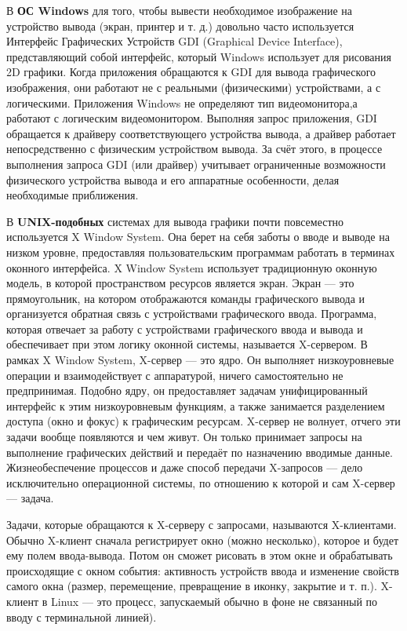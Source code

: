 \documentclass[13pt]{extarticle}
\begin{document}
В \textbf{ОС Windows} для того, чтобы вывести необходимое изображение на устройство вывода (экран, принтер и т. д.) довольно часто используется Интерфейс Графических Устройств GDI (Graphical Device Interface), представляющий собой интерфейс, который Windows использует для рисования 2D графики. Когда приложения обращаются к GDI для вывода графического изображения, они работают не с реальными (физическими) устройствами, а с логическими. Приложения Windows не определяют тип видеомонитора,а работают с логическим видеомонитором. Выполняя запрос приложения, GDI обращается к драйверу соответствующего устройства вывода, а драйвер работает непосредственно с физическим устройством вывода. За счёт этого, в процессе выполнения запроса GDI (или драйвер) учитывает ограниченные возможности физического устройства вывода и его аппаратные особенности, делая необходимые приближения. 

В \textbf{UNIX-подобных} системах для вывода графики почти повсеместно используется X Window System. Она берет на себя заботы о вводе и выводе на низком уровне, предоставляя пользовательским программам работать в терминах оконного интерфейса. X Window System использует традиционную оконную модель, в которой пространством ресурсов является экран. Экран — это прямоугольник, на котором отображаются команды графического вывода и организуется обратная связь с устройствами графического ввода. Программа, которая отвечает за работу с устройствами графического ввода и вывода и обеспечивает при этом логику оконной системы, называется X-сервером. В рамках X Window System, X-сервер — это ядро. Он выполняет низкоуровневые операции и взаимодействует с аппаратурой, ничего самостоятельно не предпринимая. Подобно ядру, он предоставляет задачам унифицированный интерфейс к этим низкоуровневым функциям, а также занимается разделением доступа (окно и фокус) к графическим ресурсам. X-сервер не волнует, отчего эти задачи вообще появляются и чем живут. Он только принимает запросы на выполнение графических действий и передаёт по назначению вводимые данные. Жизнеобеспечение процессов и даже способ передачи X-запросов — дело исключительно операционной системы, по отношению к которой и сам X-сервер — задача.

Задачи, которые обращаются к X-серверу с запросами, называются X-клиентами. Обычно X-клиент сначала регистрирует окно (можно несколько), которое и будет ему полем ввода-вывода. Потом он сможет рисовать в этом окне и обрабатывать происходящие с окном события: активность устройств ввода и изменение свойств самого окна (размер, перемещение, превращение в иконку, закрытие и т. п.). X-клиент в Linux — это процесс, запускаемый обычно в фоне не связанный по вводу с терминальной линией). 
\end{document}

